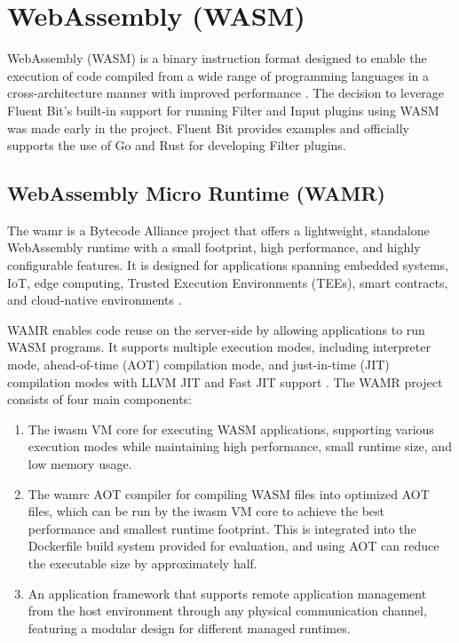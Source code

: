 \section{WebAssembly (WASM)}
WebAssembly (WASM) is a binary instruction format designed to enable the execution of code compiled from a wide range of programming languages in a cross-architecture manner with improved performance \cite{Webassembly}. The decision to leverage Fluent Bit's built-in support for running Filter and Input plugins using WASM was made early in the project. Fluent Bit provides examples and officially supports the use of Go and Rust for developing Filter plugins.

\subsection{WebAssembly Micro Runtime (WAMR)}
The \acrfull{wamr} \cite{wamr-about} is a Bytecode Alliance project that offers a lightweight, standalone WebAssembly runtime with a small footprint, high performance, and highly configurable features. It is designed for applications spanning embedded systems, IoT, edge computing, Trusted Execution Environments (TEEs), smart contracts, and cloud-native environments \cite{wamr-docs}.


WAMR enables code reuse on the server-side by allowing applications to run WASM programs. It supports multiple execution modes, including interpreter mode, ahead-of-time (AOT) compilation mode, and just-in-time (JIT) compilation modes with LLVM JIT and Fast JIT support \cite{wamr-docs}. The WAMR project consists of four main components:

\begin{enumerate}
    \item The iwasm VM core for executing WASM applications, supporting various execution modes while maintaining high performance, small runtime size, and low memory usage.
    \item The wamrc AOT compiler for compiling WASM files into optimized AOT files, which can be run by the iwasm VM core to achieve the best performance and smallest runtime footprint. This is integrated into the Dockerfile build system provided for evaluation, and using AOT can reduce the executable size by approximately half.
    \item An application framework that supports remote application management from the host environment through any physical communication channel, featuring a modular design for different managed runtimes.
\end{enumerate}

